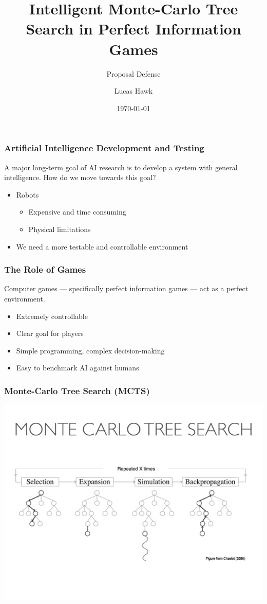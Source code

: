 \documentclass{beamer}
\title{Intelligent Monte-Carlo Tree Search in Perfect Information Games}
\subtitle{Proposal Defense}
\author{Lucas Hawk}
\date{\today}
\begin{document}
\begin{frame}
  \titlepage
\end{frame}


\begin{frame}
\frametitle{Artificial Intelligence Development and Testing}
 A major long-term goal of AI research is to develop a system with general intelligence.  How do we move towards this goal?
\begin{itemize}
 \item Robots
\begin{itemize}
 \item Expensive and time consuming
 \item Physical limitations
\end{itemize}
 \item We need a more testable and controllable environment
\end{itemize}

\end{frame}

\begin{frame}
\frametitle{The Role of Games}
 Computer games --- specifically perfect information games --- act as a perfect environment.
\begin{itemize}
 \item Extremely controllable
 \item Clear goal for players
 \item Simple programming, complex decision-making
 \item Easy to benchmark AI against humans
\end{itemize}
\end{frame}

\begin{frame}
\frametitle{Monte-Carlo Tree Search (MCTS)}
\vspace{-0.75in}
\begin{center}
\includegraphics[clip, trim={0 4cm 0 5cm}, scale=.5]{images/mcts.jpg}
\end{center}
\end{frame}
\end{document}
